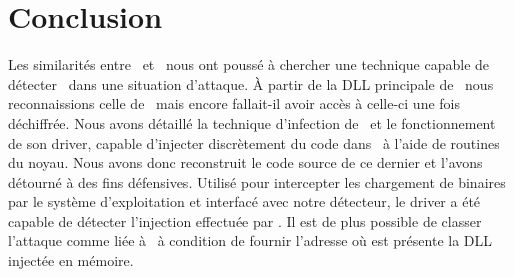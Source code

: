 \section{Conclusion}
Les similarités entre \Duqu\ et \Stuxnet\ nous ont poussé à chercher une technique capable de détecter \Duqu\ dans une situation d'attaque. À partir de la DLL principale de \Stuxnet\ nous reconnaissions celle de \Duqu\ mais encore fallait-il avoir accès à celle-ci une fois déchiffrée.
Nous avons détaillé la technique d'infection de \Duqu\ et le fonctionnement de son driver, capable d'injecter discrètement du code dans \service\ à l'aide de routines du noyau.
Nous avons donc reconstruit le code source de ce dernier et l'avons détourné à des fins défensives. Utilisé pour intercepter les chargement de binaires par le système d'exploitation et interfacé avec notre détecteur, le driver a été capable de détecter l'injection effectuée par \Duqu.
Il est de plus possible de classer l'attaque comme liée à \Stuxnet\ à condition de fournir l'adresse où est présente la DLL injectée en mémoire.



\nocite{*}
% 
%
%


